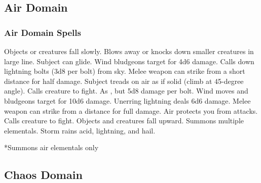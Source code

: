 \subsection{Air Domain}

\subsubsection{Air Domain Spells}
\begin{spelllist}
   Objects or creatures fall slowly.
   Blows away or knocks down smaller creatures in large line.
   Subject can glide.
   Wind bludgeons target for 4d6 damage.
   Calls down lightning bolts (3d8 per bolt) from sky.
   Melee weapon can strike from a short distance for half damage.
   Subject treads on air as if solid (climb at 45-degree angle).
   Calls creature to fight.
   As , but 5d8 damage per bolt.
   Wind moves and bludgeons target for 10d6 damage.
   Unerring lightning deals 6d6 damage.
   Melee weapon can strike from a distance for full damage.
   Air protects you from attacks. 
   Calls creature to fight.
   Objects and creatures fall upward.
   Summons multiple elementals.
   Storm rains acid, lightning, and hail.
\end{spelllist}
*Summons air elementals only

\subsection{Chaos Domain}

